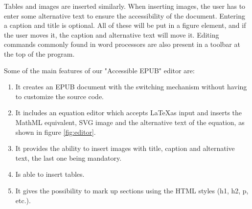 \documentclass[runningheads,a4paper]{llncs}
\begin{document}
Tables and images are inserted similarly. When inserting images, the user has to enter some alternative text to ensure the accessibility of the document. Entering a caption and title is optional. All of these will be put in a figure element, and if the user moves it, the caption and alternative text will move it. Editing commands commonly found in word processors are also present in a toolbar at the top of the program.

\noindent Some of the main features of our "Accessible EPUB" editor are: 
\begin{enumerate}
\item It creates an EPUB document with the switching mechanism without having to customize the source code.
\item It includes an equation editor which accepts \LaTeX  as input and inserts the MathML equivalent, SVG image and the alternative text of the equation, as shown in figure \ref{fig:editor}.
\item It provides the ability to insert images with title, caption and alternative text, the last one being mandatory.
\item Is able to insert tables.
\item It gives the possibility to mark up sections using the HTML styles (h1, h2, p, etc.).
\end{enumerate}
\end{document}

